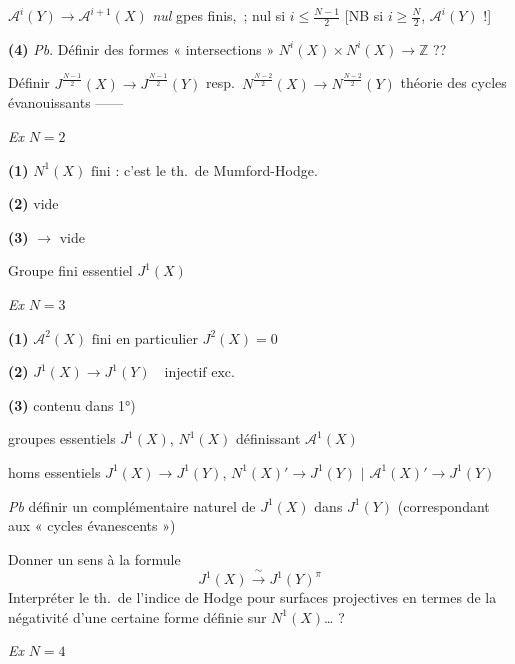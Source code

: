 \documentclass[11pt,a4paper]{article}
\begin{document}
$\mathcal{A}^{i}(Y) \longrightarrow \mathcal{A}^{i+1}(X)$ \quad \emph{nul}
 gpes finis, \,; nul si $i \leqslant \frac{N-1}{2}$
[NB si $i \geqslant \frac{N}{2}$, $\mathcal{A}^{i}(Y)$  !]

\textbf{(4)} \quad \emph{Pb}. Définir des formes « intersections »
$N^{i}(X) \times N^{i}(X) \to \mathbb{Z}$ ??

Définir  $J^{\frac{N-1}{2}}(X) \to J^{\frac{N-1}{2}}(Y)$ resp.\
$N^{\frac{N-2}{2}}(X) \to N^{\frac{N-2}{2}}(Y)$  théorie des
cycles évanouissants ------


\emph{Ex} \quad $N = 2$

\textbf{(1)} \quad $\boxed{N^{1}(X) \text{ fini}}$ : c'est le th.\ de
\struck{\ill{}} Mumford-Hodge.

\textbf{(2)} \quad vide

\textbf{(3)} \quad {} $\to$ vide

Groupe fini essentiel \quad $J^{1}(X)$

\emph{Ex} \quad $N = 3$

\textbf{(1)} \quad $\boxed{\mathcal{A}^{2}(X) \text{ fini}}$ \quad en
particulier $J^{2}(X) = 0$

\textbf{(2)} \quad $\boxed{J^{1}(X) \to J^{1}(Y) \quad \text{injectif exc.}}$
\struck{\ill{}}

\textbf{(3)} \quad {} contenu dans 1°)

groupes essentiels \quad $J^{1}(X)$, $N^{1}(X)$ \quad définissant
$\mathcal{A}^{1}(X)$

homs essentiels \quad $J^{1}(X) \longrightarrow J^{1}(Y)$, \quad
$N^{1}(X)' \longrightarrow J^{1}(Y)$ \quad $\bigl|$ \quad
$\mathcal{A}^{1}(X)' \longrightarrow J^{1}(Y)$


\emph{Pb} \quad définir un complémentaire naturel de $J^{1}(X)$ dans
$J^{1}(Y)$ (correspondant aux « cycles évanescents »)

Donner un sens à la formule
\[
J^{1}(X) \xrightarrow{\ \sim\ } J^{1}(Y)^{\pi}
\]
Interpréter le th.\ de  l'indice de Hodge pour surfaces
projectives en termes de la négativité d'une certaine forme définie sur
$N^{1}(X)$… ?

\emph{Ex} \quad $N = 4$
\end{document}
